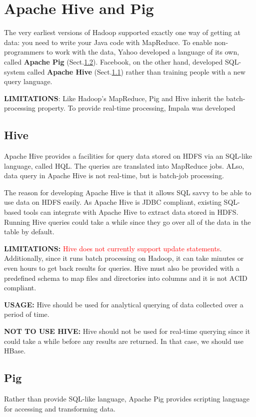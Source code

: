 \chapter{Apache Hive and Pig}
\label{chap:Hive_PrestoDB}

The very earliest versions of Hadoop supported exactly one way of getting at
data: you need to write your Java code with MapReduce. To enable non-programmers
to work with the data, Yahoo developed a language of its own, called {\bf
Apache Pig} (Sect.\ref{sec:pig}). Facebook, on the other hand, developed
SQL-system called {\bf Apache Hive} (Sect.\ref{sec:hive}) rather than training
people with a new query language.

{\bf LIMITATIONS}: Like Hadoop's MapReduce, Pig and Hive inherit the
batch-processing property. To provide real-time processing, Impala was
developed 

\section{Hive}
\label{sec:hive}

Apache Hive provides a facilities for query data stored on HDFS via an SQL-like
language, called HQL. The queries are translated into MapReduce jobs. 
ALso, data query in Apache Hive is not real-time, but is batch-job processing.

The reason for developing Apache Hive is that it allows SQL savvy to be able to
use data on HDFS easily. As Apache Hive is JDBC compliant, existing SQL-based
tools can integrate with Apache Hive to extract data stored in HDFS. 
Running Hive queries could take a while since they go over all of the data in
the table by default.

{\bf LIMITATIONS:} \textcolor{red}{Hive does not currently support update
statements}. Additionally, since it runs batch processing on Hadoop, it can take
minutes or even hours to get back results for queries. Hive must also be
provided with a predefined schema to map files and directories into columns and
it is not ACID compliant.

{\bf USAGE:} Hive should be used for analytical querying of data collected over
a period of time. 

{\bf NOT TO USE HIVE:} Hive should not be used for real-time querying since it
could take a while before any results are returned. In that case, we should use
HBase. 


\section{Pig}
\label{sec:pig}

Rather than provide SQL-like language, Apache Pig provides scripting language
for accessing and transforming data.
